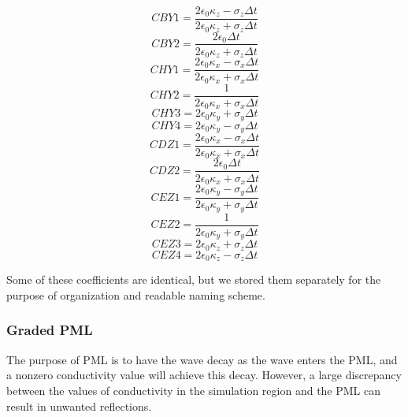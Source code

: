 \documentclass{article}
\begin{document}
 \begin{equation}
   CBY1=\frac{2\epsilon_{0}\kappa_{z}-\sigma_{z}\Delta t}{2\epsilon_{0}\kappa_{z}+\sigma_{z}\Delta t}
 \end{equation}
 \begin{equation}
   CBY2=\frac{2\epsilon_{0}\Delta t}{2\epsilon_{0}\kappa_{z}+\sigma_{z}\Delta t}
 \end{equation}
 \begin{equation}
   CHY1=\frac{2\epsilon_{0}\kappa_{x}-\sigma_{x}\Delta t}{2\epsilon_{0}\kappa_{x}+\sigma_{x}\Delta t}
 \end{equation}
 \begin{equation}
   CHY2=\frac{1}{2\epsilon_{0}\kappa_{x}+\sigma_{x}\Delta t}
 \end{equation}
 \begin{equation}
   CHY3=2\epsilon_{0}\kappa_{y}+\sigma_{y}\Delta t
 \end{equation}
  \begin{equation}
   CHY4=2\epsilon_{0}\kappa_{y}-\sigma_{y}\Delta t
 \end{equation}
  \begin{equation}
   CDZ1=\frac{2\epsilon_{0}\kappa_{x}-\sigma_{x}\Delta t}{2\epsilon_{0}\kappa_{x}+\sigma_{x}\Delta t}
 \end{equation}
 \begin{equation}
   CDZ2=\frac{2\epsilon_{0}\Delta t}{2\epsilon_{0}\kappa_{x}+\sigma_{x}\Delta t}
 \end{equation}
 \begin{equation}
   CEZ1=\frac{2\epsilon_{0}\kappa_{y}-\sigma_{y}\Delta t}{2\epsilon_{0}\kappa_{y}+\sigma_{y}\Delta t}
 \end{equation}
 \begin{equation}
   CEZ2=\frac{1}{2\epsilon_{0}\kappa_{y}+\sigma_{y}\Delta t}
 \end{equation}
 \begin{equation}
   CEZ3=2\epsilon_{0}\kappa_{z}+\sigma_{z}\Delta t
 \end{equation}
  \begin{equation}
   CEZ4=2\epsilon_{0}\kappa_{z}-\sigma_{z}\Delta t
 \end{equation}

 Some of these coefficients are identical, but we stored them separately for the
 purpose of organization and readable naming scheme.
 
\subsubsection{Graded PML}
The purpose of PML is to have the wave decay as the wave enters the PML, and a
nonzero conductivity value will achieve this decay. However, a large discrepancy
between the values of conductivity in the simulation region and the PML can
result in unwanted reflections.
\end{document}
